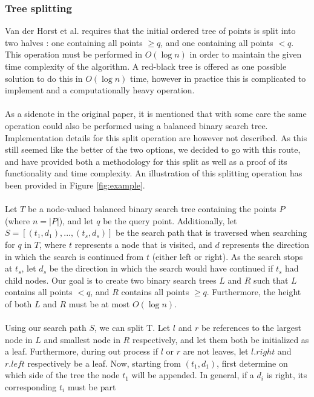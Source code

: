 \documentclass{article}
\begin{document}
\subsubsection{Tree splitting}
Van der Horst et al. requires that the initial ordered tree of points is split
into two halves \cite{vanderhorst_et_al:LIPIcs.ESA.2022.67}: one containing all
points $\geq q$, and one containing all points $< q$. This operation must be
performed in $O(\log n)$ in order to maintain the given time complexity of the
algorithm. A red-black tree is offered as one possible solution to do this in
$O(\log n)$ time, however in practice this is complicated to implement and a
computationally heavy operation.\\\\ As a sidenote in the original paper, it is
mentioned that with some care the same operation could also be performed using
a balanced binary search tree. Implementation details for this split operation
are however not described. As this still seemed like the better of the two
options, we decided to go with this route, and have provided both a methodology
for this split as well as a proof of its functionality and time complexity. An
illustration of this splitting operation has been provided in Figure
\ref{fig:example}. \\\\ Let $T$ be a node-valued balanced binary search tree
containing the points $P$ (where $n = |P|$), and let $q$ be the query point.
Additionally, let $S = [(t_1, d_1), ..., (t_s, d_s)]$ be the search path that
is traversed when searching for $q$ in $T$, where $t$ represents a node that is
visited, and $d$ represents the direction in which the search is continued from
$t$ (either left or right). As the search stops at $t_s$, let $d_s$ be the
direction in which the search would have continued if $t_s$ had child nodes.
Our goal is to create two binary search trees $L$ and $R$ such that $L$
contains all points $<q$, and $R$ contains all points $\geq q$. Furthermore,
the height of both $L$ and $R$ must be at most $O(\log n)$. \\\\ Using our
search path $S$, we can split T. Let $l$ and $r$ be references to the largest
node in $L$ and smallest node in $R$ respectively, and let them both be
initialized as a leaf. Furthermore, during out process if $l$ or $r$ are not
leaves, let $l.right$ and $r.left$ respectively be a leaf. Now, starting from
$(t_1, d_1)$, first determine on which side of the tree the node $t_1$ will be
appended. In general, if a $d_i$ is right, its corresponding $t_i$ must be part
\end{document}
